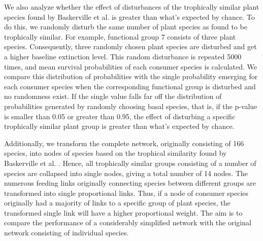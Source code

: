 \documentclass[a4paper,11pt]{article}
\begin{document}
We also analyze whether the effect of disturbances of the trophically similar plant species found by Baskerville et al. \citep{Baskervilleetal2011} is greater than what's expected by chance. To do this, we randomly disturb the same number of plant species as found to be trophically similar. For example, functional group 7 \citep{Baskervilleetal2011} consists of three plant species. Consequently, three randomly chosen plant species are disturbed and get a higher baseline extinction level. This random disturbance is repeated 5000 times, and mean survival probabilities of each consumer species is calculated. We compare this distribution of probabilities with the single probability emerging for each consumer species when the corresponding functional group is disturbed and no randomness exist. If the single value falls far off the distribution of probabilities generated by randomly choosing basal species, that is, if the p-value is smaller than 0.05 or greater than 0.95, the effect of disturbing a specific trophically similar plant group is greater than what's expected by chance. 

Additionally, we transform the complete network, originally consisting of 166 species, into nodes of species based on the trophical similarity found by Baskerville et al. \citep{Baskervilleetal2011}. Hence, all trophically similar groups consisting of a number of species are collapsed into single nodes, giving a total number of 14 nodes. The numerous feeding links originally connecting species between different groups are transformed into single proportional links. Thus, if a node of consumer species originally had a majority of links to a specific group of plant species, the transformed single link will have a higher proportional weight. The aim is to compare the performance of a considerably simplified network with the original network consisting of individual species.


\end{document}

